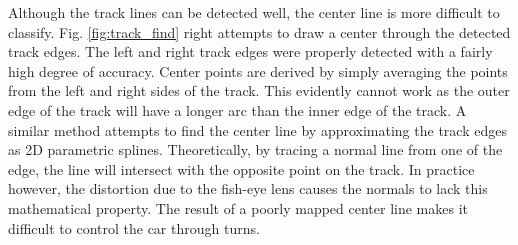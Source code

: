 \documentclass{article}
\begin{document}
Although the track lines can be detected well, the center line is more difficult to classify. Fig. \ref{fig:track_find} right attempts to draw a center through the detected track edges. The left and right track edges were properly detected with a fairly high degree of accuracy. Center points are derived by simply averaging the points from the left and right sides of the track. This evidently cannot work as the outer edge of the track will have a longer arc than the inner edge of the track. A similar method attempts to find the center line by approximating the track edges as 2D parametric splines. Theoretically, by tracing a normal line from one of the edge, the line will intersect with the opposite point on the track. In practice however, the distortion due to the fish-eye lens causes the normals to lack this mathematical property. The result of a poorly mapped center line makes it difficult to control the car through turns.
\end{document}
